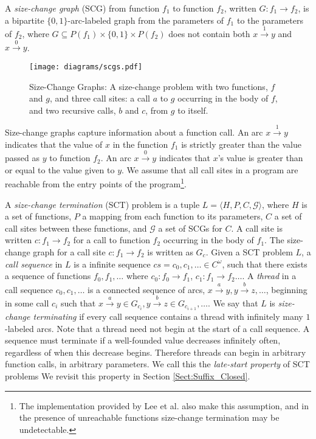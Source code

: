 \documentclass{LMCS}
\newcommand{\zug}[1]{\langle #1  \rangle}
\newcommand\deqarrow{\ensuremath{\stackrel{0}{\rightarrow}}}
\newcommand\descarrow{\stackrel{1}{\rightarrow}}
\newcommand\vararrow[1]{\stackrel{#1}{\rightarrow}}
\newcommand{\G}{{\mathcal G}}
\begin{document}
\begin{defi}
A \emph{size-change graph} (SCG) from function $f_1$ to function $f_2$, written
$G : f_1 \rightarrow f_2$, is a bipartite $\{0,1\}$-arc-labeled graph from
the parameters of $f_1$ to the parameters of  $f_2$, where $G \subseteq P(f_1)
\times \{0,1\} \times P(f_2)$ does not contain both $x \descarrow y$ and $x
\deqarrow y$.
\end{defi}

\begin{figure}[tb]
\begin{center}
{\texttt{[image: diagrams/scgs.pdf]}}
\end{center}
\caption{Size-Change Graphs: A size-change problem with two functions, $f$ and $g$, and three call
sites: a call $a$ to $g$ occurring in the body of $f$, and two recursive calls, $b$ and $c$, from $g$ to itself.}\label{fig:scg}
\end{figure}

Size-change graphs capture information about a function call. An arc $x
\descarrow y$ indicates that the value of $x$ in the function $f_1$ is strictly
greater than the value passed as $y$ to function $f_2$.  An arc $x \deqarrow y$
indicates that $x$'s value is greater than or equal to the value given to $y$.
We assume that all call sites in a program are reachable from the entry points of the
program\footnote{The implementation provided by Lee et al.
\cite{LJB01} also make this assumption, and in the presence of unreachable
functions size-change termination may be undetectable.}.

A \emph{size-change termination} (SCT) problem is a tuple $L=\zug{H, P, C, \G}$, where $H$ is a set
of functions, $P$ a mapping from each function to its parameters, $C$ a set of call sites between
these functions, and $\G$ a set of SCGs for $C$.  A call site is written $c : f_1 \rightarrow f_2$
for a call to function $f_2$ occurring in the body of $f_1$.  The size-change graph for a call site
$c : f_1 \rightarrow f_2$ is written as $G_c$. Given a SCT problem $L$, a \emph{call sequence} in
$L$ is a infinite sequence $cs = c_0,c_1,\ldots \in C^\omega$, such that there exists a sequence of
functions $f_0,f_1,\ldots$ where $c_0 : f_0 \rightarrow f_1$, $c_1 : f_1 \rightarrow f_2\ldots$.  A
\emph{thread} in a call sequence $c_0,c_1,\ldots$ is a connected sequence of arcs, $x \vararrow{a}
y, y \vararrow{b} z,\ldots$, beginning in some call $c_i$ such that $x \vararrow{a} y \in G_{c_i}, y
\vararrow{b} z \in G_{c_{i+1}}, \ldots$.  We say that $L$ is \emph{size-change terminating} if every
call sequence contains a thread with infinitely many $1$-labeled arcs.  Note that a thread need not
begin at the start of a call sequence. A sequence must terminate if a well-founded value decreases
infinitely often, regardless of when this decrease begins. Therefore threads can begin in arbitrary
function calls, in arbitrary parameters. We call this the \emph{late-start property} of SCT
problems We revisit this property in Section \ref{Sect:Suffix_Closed}.
\end{document}
